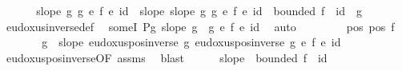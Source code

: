 \begin{isabellebody}
%
\isadelimproof
%
\endisadelimproof
%
\isatagproof
{}\isamarkupfalse%
\ {\isacharminus}{\kern0pt}\isanewline
\ \ \isamarkupfalse%
\ {\isacharasterisk}{\kern0pt}{\isacharcolon}{\kern0pt}\ {\isachardoublequoteopen}{\isasymlbrakk}slope\ g{\isacharsemicolon}{\kern0pt}\ {\isacharparenleft}{\kern0pt}g\ {\isacharasterisk}{\kern0pt}\isactrlsub e\ f{\isacharparenright}{\kern0pt}\ {\isasymsim}\isactrlsub e\ id{\isasymrbrakk}\ {\isasymLongrightarrow}\ {\isacharquery}{\kern0pt}slope{\isachardoublequoteclose}\ {\isachardoublequoteopen}{\isasymlbrakk}slope\ g{\isacharsemicolon}{\kern0pt}\ {\isacharparenleft}{\kern0pt}g\ {\isacharasterisk}{\kern0pt}\isactrlsub e\ f{\isacharparenright}{\kern0pt}\ {\isasymsim}\isactrlsub e\ id{\isacharsemicolon}{\kern0pt}\ {\isasymnot}\ bounded\ f{\isasymrbrakk}\ {\isasymLongrightarrow}\ {\isacharquery}{\kern0pt}id{\isachardoublequoteclose}\ \ g\ \isanewline
\ \ \ \ \isamarkupfalse%
\ eudoxus{\isacharunderscore}{\kern0pt}inverse{\isacharunderscore}{\kern0pt}def\ \isamarkupfalse%
\ someI{\isacharbrackleft}{\kern0pt}\ {\isacharquery}{\kern0pt}P{\isacharequal}{\kern0pt}{\isachardoublequoteopen}{\isasymlambda}g{\isachardot}{\kern0pt}\ slope\ g\ {\isasymand}\ {\isacharparenleft}{\kern0pt}g\ {\isacharasterisk}{\kern0pt}\isactrlsub e\ f{\isacharparenright}{\kern0pt}\ {\isasymsim}\isactrlsub e\ id{\isachardoublequoteclose}{\isacharbrackright}{\kern0pt}\ \isamarkupfalse%
\ auto\isanewline
\ \ \isacommand{{\isacharbraceleft}{\kern0pt}}\isamarkupfalse%
\isanewline
\ \ \ \ \isamarkupfalse%
\ pos{\isacharcolon}{\kern0pt}\ {\isachardoublequoteopen}pos\ f{\isachardoublequoteclose}\isanewline
\ \ \ \ \isamarkupfalse%
\ \isamarkupfalse%
\ g\ \ {\isachardoublequoteopen}slope\ {\isacharparenleft}{\kern0pt}eudoxus{\isacharunderscore}{\kern0pt}pos{\isacharunderscore}{\kern0pt}inverse\ g{\isacharparenright}{\kern0pt}{\isachardoublequoteclose}\ {\isachardoublequoteopen}eudoxus{\isacharunderscore}{\kern0pt}pos{\isacharunderscore}{\kern0pt}inverse\ g\ {\isacharasterisk}{\kern0pt}\isactrlsub e\ f\ {\isasymsim}\isactrlsub e\ id{\isachardoublequoteclose}\ \isamarkupfalse%
\ eudoxus{\isacharunderscore}{\kern0pt}pos{\isacharunderscore}{\kern0pt}inverse{\isacharbrackleft}{\kern0pt}OF\ assms{\isacharbrackright}{\kern0pt}\ \isamarkupfalse%
\ blast\isanewline
\ \ \ \ \isamarkupfalse%
\ {\isacharquery}{\kern0pt}slope\ {\isachardoublequoteopen}{\isasymnot}\ bounded\ f\ {\isasymLongrightarrow}\ {\isacharquery}{\kern0pt}id{\isachardoublequoteclose}\ \isamarkupfalse%

\end{isabellebody}
